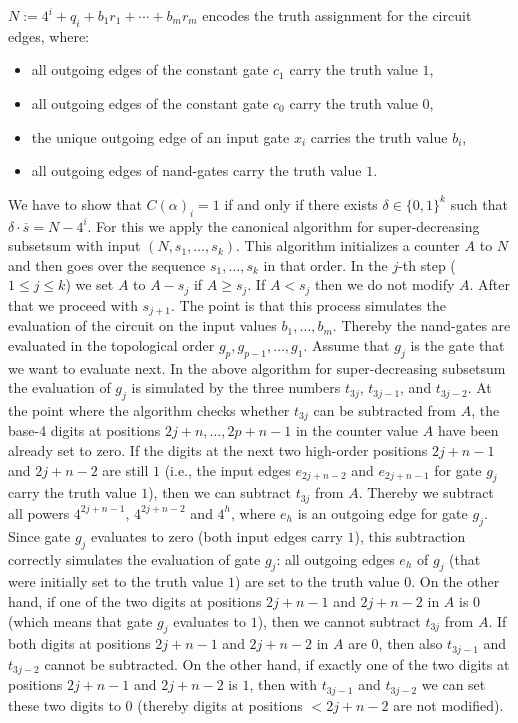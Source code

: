 $N := 4^i + q_{i} + b_1 r_1 + \cdots + b_m r_m$ encodes the truth assignment for the circuit edges, where:
\begin{itemize}
\item all outgoing edges of the constant gate $c_1$ carry the truth value $1$, 
\item all outgoing edges of the constant gate $c_0$ carry the truth value $0$, 
\item the unique outgoing edge of an input gate $x_i$ carries the truth value $b_i$,
\item all outgoing edges of {\sf nand}-gates 
carry the truth value $1$.
\end{itemize}
We have to show that $C(\alpha)_i = 1$  if and only if there exists
$\delta \in \{0,1\}^k$ such that $\delta \cdot \overline{s} = N-4^i$.
For this we apply the canonical algorithm for super-decreasing subsetsum with input $(N,s_1,\ldots,s_k)$.
This algorithm initializes a counter $A$ to $N$ and then goes over the sequence $s_1,\ldots,s_k$ in that order.
In the $j$-th step ($1 \leq j \leq k$) we set $A$ to $A-s_j$ if $A \geq s_j$. If $A < s_j$ then we do not modify $A$.
After that we proceed with $s_{j+1}$. The point is that 
this process simulates the evaluation of the circuit on the input values $b_1, \ldots, b_m$. Thereby
the {\sf nand}-gates are evaluated in the topological order $g_p, g_{p-1}, \ldots, g_1$. Assume that $g_j$ is the gate that we 
want to evaluate next. In the above algorithm for super-decreasing subsetsum the evaluation of $g_j$ is simulated 
by the three numbers $t_{3j}$, $t_{3j-1}$, and $t_{3j-2}$. At the point where the algorithm checks whether $t_{3j}$ can 
be subtracted from $A$, the base-4 digits at positions $2j+n,\ldots, 2p+n-1$ in the counter value $A$ have been already set to zero. If the digits at the next two high-order 
positions $2j+n-1$ and $2j+n-2$ are still $1$ (i.e., the input edges $e_{2j+n-2}$ and $e_{2j+n-1}$ for gate
$g_j$ carry the truth value $1$), then we can subtract $t_{3j}$ from $A$. Thereby we subtract all powers
$4^{2j+n-1}$, $4^{2j+n-2}$ and
$4^h$, where $e_h$ is an outgoing edge for gate $g_j$. Since gate $g_j$ evaluates to zero (both input edges carry $1$), this subtraction
correctly simulates the evaluation of gate $g_j$: all outgoing edges $e_h$ of $g_j$ (that were initially set to the truth value $1$) are set to the 
truth value $0$. On the other hand, if one of the two digits at
positions $2j+n-1$ and $2j+n-2$ in $A$ is $0$ (which means that gate $g_j$ evaluates to $1$), then we 
cannot subtract $t_{3j}$ from $A$. If both digits at positions $2j+n-1$ and $2j+n-2$ in $A$ are $0$, then
also $t_{3j-1}$ and $t_{3j-2}$ cannot be subtracted. On the other hand, if exactly one of the two digits
at positions $2j+n-1$ and $2j+n-2$ is $1$, then with
$t_{3j-1}$ and $t_{3j-2}$ we can set  these two digits to $0$ (thereby digits at positions $< 2j+n-2$ are not modified).

